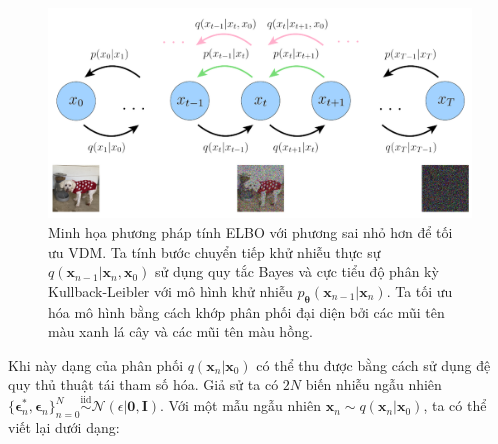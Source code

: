 \documentclass[14pt, a4paper]{article}
\numberwithin{equation}{section}
\numberwithin{figure}{section}
\numberwithin{dl}{section}
\numberwithin{md}{section}
\numberwithin{bd}{section}
\numberwithin{dn}{section}
\numberwithin{hq}{section}
\begin{document}
    \begin{figure}[h!]
        \centering
        \includegraphics[width=\textwidth]{VDM-Optimize-Backprop.png}
        \caption{Minh họa phương pháp tính ELBO với phương sai nhỏ hơn để tối ưu VDM.
        Ta tính bước chuyển tiếp khử nhiễu thực sự $q(\boldsymbol{x}_{n-1} \vert \boldsymbol{x}_n, \boldsymbol{x}_0)$ sử dụng quy tắc Bayes và cực tiểu độ phân kỳ Kullback-Leibler với mô hình khử nhiễu $p_{\boldsymbol{\theta}} (\boldsymbol{x}_{n-1} \vert \boldsymbol{x}_n)$.
        Ta tối ưu hóa mô hình bằng cách khớp phân phối đại diện bởi các mũi tên màu xanh lá cây và các mũi tên màu hồng.}
        \label{fig:VDM-Optimize-Backprop}
    \end{figure}

    Khi này dạng của phân phối $q(\boldsymbol{x}_n \vert \boldsymbol{x}_0)$ có thể thu được bằng cách sử dụng đệ quy thủ thuật tái tham số hóa.
    Giả sử ta có $2N$ biến nhiễu ngẫu nhiên $\lbrace \boldsymbol{\epsilon}_n^{\ast}, \boldsymbol{\epsilon}_n \rbrace_{n=0}^N \stackrel{\text{iid}}{\sim} \mathcal{N}(\epsilon \vert \boldsymbol{0}, \boldsymbol{I})$.
    Với một mẫu ngẫu nhiên $\boldsymbol{x}_n \sim q(\boldsymbol{x}_n \vert \boldsymbol{x}_0)$, ta có thể viết lại dưới dạng:
\end{document}
